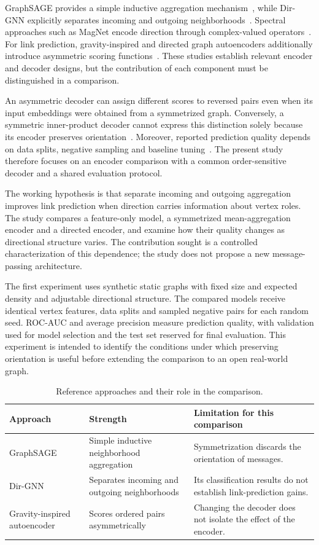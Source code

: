 \documentclass{article}
\begin{document}
GraphSAGE provides a simple inductive aggregation mechanism~\cite{sage}, while Dir-GNN explicitly separates incoming and outgoing neighborhoods~\cite{dirgnn}.
Spectral approaches such as MagNet encode direction through complex-valued operators~\cite{magnet}.
For link prediction, gravity-inspired and directed graph autoencoders additionally introduce asymmetric scoring functions~\cite{gravity,digae}.
These studies establish relevant encoder and decoder designs, but the contribution of each component must be distinguished in a comparison.

An asymmetric decoder can assign different scores to reversed pairs even when its input embeddings were obtained from a symmetrized graph.
Conversely, a symmetric inner-product decoder cannot express this distinction solely because its encoder preserves orientation~\cite{vgae,complex}.
Moreover, reported prediction quality depends on data splits, negative sampling and baseline tuning~\cite{heart}.
The present study therefore focuses on an encoder comparison with a common order-sensitive decoder and a shared evaluation protocol.

The working hypothesis is that separate incoming and outgoing aggregation improves link prediction when direction carries information about vertex roles.
The study compares a feature-only model, a symmetrized mean-aggregation encoder and a directed encoder, and examine how their quality changes as directional structure varies.
The contribution sought is a controlled characterization of this dependence; the study does not propose a new message-passing architecture.

The first experiment uses synthetic static graphs with fixed size and expected density and adjustable directional structure.
The compared models receive identical vertex features, data splits and sampled negative pairs for each random seed.
ROC-AUC and average precision measure prediction quality, with validation used for model selection and the test set reserved for final evaluation.
This experiment is intended to identify the conditions under which preserving orientation is useful before extending the comparison to an open real-world graph.

\begin{table}[H]
\centering
\small
\caption{Reference approaches and their role in the comparison.}
\label{tab:alternatives}
\begin{tabular}{p{}p{}p{}}
\toprule
Approach & Strength & Limitation for this comparison \\
\midrule
GraphSAGE~\cite{sage} & Simple inductive neighborhood aggregation & Symmetrization discards the orientation of messages. \\
Dir-GNN~\cite{dirgnn} & Separates incoming and outgoing neighborhoods & Its classification results do not establish link-prediction gains. \\
Gravity-inspired autoencoder~\cite{gravity} & Scores ordered pairs asymmetrically & Changing the decoder does not isolate the effect of the encoder. \\
\bottomrule
\end{tabular}
\end{table}
\end{document}
